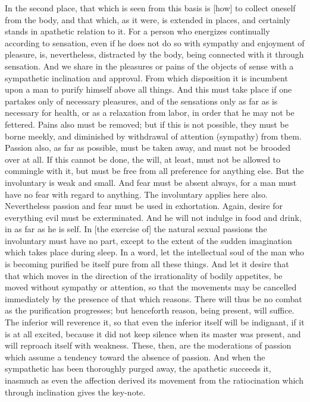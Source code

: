 \documentclass[12pt]{article}
\begin{document}
In the second place, that which is seen from this basis is [how] to collect
oneself from the body, and that which, as it were, is extended in places, and
certainly stands in apathetic relation to it. For a person who energizes
continually according to sensation, even if he does not do so with sympathy and
enjoyment of pleasure, is, nevertheless, distracted by the body, being
connected with it through sensation. And we share in the pleasures or pains of
the objects of sense with a sympathetic inclination and approval. From which
disposition it is incumbent upon a man to purify himself above all things. And
this must take place if one partakes only of necessary pleasures, and of the
sensations only as far as is necessary for health, or as a relaxation from
labor, in order that he may not be fettered. Pains also must be removed; but if
this is not possible, they must be borne meekly, and diminished by withdrawal
of attention (sympathy) from them. Passion also, as far as possible, must be
taken away, and must not be brooded over at all. If this cannot be done, the
will, at least, must not be allowed to commingle with it, but must be free from
all preference for anything else. But the involuntary is weak and small. And
fear must be absent always, for a man must have no fear with regard to
anything. The involuntary applies here also. Nevertheless passion and fear must
be used in exhortation. Again, desire for everything evil must be exterminated.
And he will not indulge in food and drink, in as far as he is self. In [the
exercise of] the natural sexual passions the involuntary must have no part,
except to the extent of the sudden imagination which takes place during sleep.
In a word, let the intellectual soul of the man who is becoming purified be
itself pure from all these things. And let it desire that that which moves in
the direction of the irrationality of bodily appetites, be moved without
sympathy or attention, so that the movements may be cancelled immediately by
the presence of that which reasons. There will thus be no combat as the
purification progresses; but henceforth reason, being present, will suffice.
The inferior will reverence it, so that even the inferior itself will be
indignant, if it is at all excited, because it did not keep silence when its
master was present, and will reproach itself with weakness. These, then, are
the moderations of passion which assume a tendency toward the absence of
passion. And when the sympathetic has been thoroughly purged away, the
apathetic succeeds it, inasmuch as even the affection derived its movement from
the ratiocination which through inclination gives the key-note.
\end{document}
